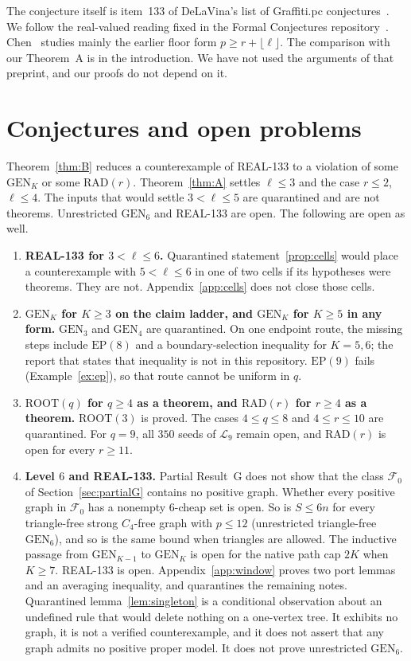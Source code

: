 \documentclass[11pt]{amsart}
\theoremstyle{definition}
\theoremstyle{remark}
\newcommand{\lr}{\ell}
\newcommand{\pp}{p}
\newcommand{\GEN}{\mathrm{GEN}}
\newcommand{\RAD}{\mathrm{RAD}}
\newcommand{\ROOT}{\mathrm{ROOT}}
\begin{document}
The conjecture itself is item~133 of DeLaVina's list of Graffiti.pc conjectures~\cite{wowii}. We follow the real-valued reading fixed in the Formal Conjectures repository~\cite{fc133,fcpr}. Chen~\cite{chen} studies mainly the earlier floor form $\pp\ge r+\lfloor\lr\rfloor$. The comparison with our Theorem~A is in the introduction. We have not used the arguments of that preprint, and our proofs do not depend on it.

\section{Conjectures and open problems}\label{sec:open}

Theorem~\ref{thm:B} reduces a counterexample of REAL-133 to a violation of some $\GEN_K$ or some $\RAD(r)$. Theorem~\ref{thm:A} settles $\lr\le 3$ and the case $r\le 2$, $\lr\le 4$. The inputs that would settle $3<\lr\le 5$ are quarantined and are not theorems. Unrestricted $\GEN_6$ and REAL-133 are open. The following are open as well.

\begin{enumerate}
\item \textbf{REAL-133 for $3<\lr\le 6$.} Quarantined statement~\ref{prop:cells} would place a counterexample with $5<\lr\le 6$ in one of two cells if its hypotheses were theorems. They are not. Appendix~\ref{app:cells} does not close those cells.
\item \textbf{$\GEN_K$ for $K\ge 3$ on the claim ladder, and $\GEN_K$ for $K\ge 5$ in any form.} $\GEN_3$ and $\GEN_4$ are quarantined. On one endpoint route, the missing steps include $\mathrm{EP}(8)$ and a boundary-selection inequality for $K=5,6$; the report that states that inequality is not in this repository. $\mathrm{EP}(9)$ fails (Example~\ref{ex:ep}), so that route cannot be uniform in $q$.
\item \textbf{$\ROOT(q)$ for $q\ge 4$ as a theorem, and $\RAD(r)$ for $r\ge 4$ as a theorem.} $\ROOT(3)$ is proved. The cases $4\le q\le 8$ and $4\le r\le 10$ are quarantined. For $q=9$, all $350$ seeds of $\mathcal L_9$ remain open, and $\RAD(r)$ is open for every $r\ge 11$.
\item \textbf{Level $6$ and REAL-133.} Partial Result~G does not show that the class $\mathcal F_0$ of Section~\ref{sec:partialG} contains no positive graph. Whether every positive graph in $\mathcal F_0$ has a nonempty $6$-cheap set is open. So is $S\le 6n$ for every triangle-free strong $C_4$-free graph with $\pp\le 12$ (unrestricted triangle-free $\GEN_6$), and so is the same bound when triangles are allowed. The inductive passage from $\GEN_{K-1}$ to $\GEN_K$ is open for the native path cap $2K$ when $K\ge 7$. REAL-133 is open. Appendix~\ref{app:window} proves two port lemmas and an averaging inequality, and quarantines the remaining notes. Quarantined lemma~\ref{lem:singleton} is a conditional observation about an undefined rule that would delete nothing on a one-vertex tree. It exhibits no graph, it is not a verified counterexample, and it does not assert that any graph admits no positive proper model. It does not prove unrestricted $\GEN_6$.
\end{enumerate}
\end{document}
